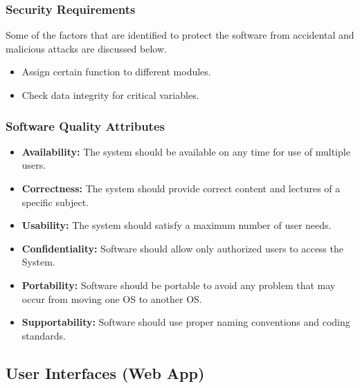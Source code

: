 \documentclass[12pt]{article}
\begin{document}
\subsubsection{Security Requirements}
Some of the factors that are identified to protect the software from accidental and malicious attacks are discussed below.
\begin{itemize}
\item Assign certain function to different modules.
\item Check data integrity for critical variables.
\end{itemize}

\subsubsection{Software Quality Attributes}
\begin{itemize}
\item \textbf{Availability:} The system should be available on any time for use of multiple users.
\item \textbf{Correctness:} The system should provide correct content and lectures of a specific subject.
\item \textbf{Usability:} The system should satisfy a maximum number of user needs.
\item \textbf{Confidentiality:} Software should allow only authorized users to access the System.
\item \textbf{Portability:} Software should be portable to avoid any problem that may occur from moving one OS to another OS.
\item \textbf{Supportability:} Software should use proper naming conventions and coding standards.
\end{itemize}



\newpage
\subsection{User Interfaces (Web App)}
\end{document}
